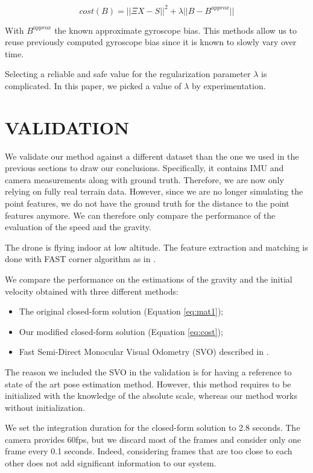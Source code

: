 \documentclass[letterpaper, 10 pt, conference]{ieeeconf}  %
\begin{document}
\[
cost(B) = ||\Xi X - S||^2 + \lambda ||B - B^{approx}||
\]

With $B^{approx}$ the known approximate gyroscope bias.
This methods allow us to reuse previously computed gyroscope bias since it is known to slowly vary over time.

Selecting a reliable and safe value for the regularization parameter $\lambda$ is complicated.
In this paper, we picked a value of $\lambda$ by experimentation.

\section{VALIDATION}

We validate our method against a different dataset than the one we used in the previous sections to draw our conclusions.
Specifically, it contains IMU and camera measurements along with ground truth.
Therefore, we are now only relying on fully real terrain data.
However, since we are no longer simulating the point features, we do not have the ground truth for the distance to the point features anymore.
We can therefore only compare the performance of the evaluation of the speed and the gravity.

The drone is flying indoor at low altitude.
The feature extraction and matching is done with FAST corner algorithm as in \cite{Forster2014}.

We compare the performance on the estimations of the gravity and the initial velocity obtained with three different methods:
\begin{itemize}
\item The original closed-form solution (Equation \ref{eq:mat1});
\item Our modified closed-form solution (Equation \ref{eq:cost});
\item Fast Semi-Direct Monocular Visual Odometry (SVO) described in \cite{Forster2014}.
\end{itemize}
The reason we included the SVO in the validation is for having a reference to state of the art pose estimation method.
However, this method requires to be initialized with the knowledge of the absolute scale, whereas our method works without initialization.

We set the integration duration for the closed-form solution to 2.8 seconds.
The camera provides 60fps, but we discard most of the frames and consider only one frame every 0.1 seconds.
Indeed, considering frames that are too close to each other does not add significant information to our system.
\end{document}
